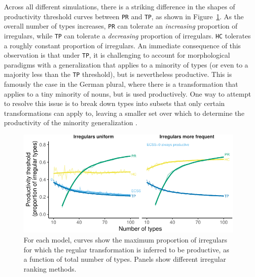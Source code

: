 \documentclass[
   11pt,
       ]{book}
\begin{document}
Across all different simulations, there is a striking difference in the shapes
of productivity threshold curves between \texttt{PR} and \texttt{TP}, as shown in
Figure~\ref{fig:thresholds-ranks}. As the overall number of types increases,
\texttt{PR} can tolerate an \emph{increasing} proportion of irregulars, while \texttt{TP} can
tolerate a \emph{decreasing} proportion of irregulars. \texttt{HC} tolerates a roughly
constant proportion of irregulars. An immediate consequence of this observation
is that under \texttt{TP}, it is challenging to account for morphological paradigms
with a generalization that applies to a minority of types (or even to a majority
less than the \texttt{TP} threshold), but is nevertheless productive. This is famously
the case in the German plural, where there is a transformation that applies to a
tiny minority of nouns, but is used productively. One way to attempt to resolve
this issue is to break down types into subsets that only certain transformations
can apply to, leaving a smaller set over which to determine the productivity of
the minority generalization \citep{yang2016}.

\begin{figure}

{\centering \includegraphics[width=\textwidth]{04-prod-comp/figures/thresholds-ranks-1} 

}

\caption{For each model, curves show the maximum proportion of irregulars for which the regular transformation is inferred to be productive, as a function of total number of types. Panels show different irregular ranking methods.}\label{fig:thresholds-ranks}
\end{figure}
\end{document}
